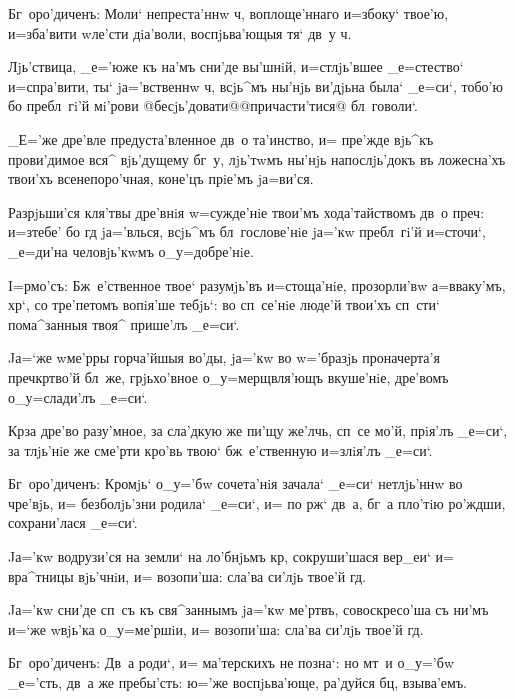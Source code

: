 Бг~оро'диченъ: Моли` непреста'ннw ч, 
воплоще'ннаго и=з\ъ боку` твое'ю, и=зба'вити w\т ле'сти 
дiа'воли, воспjьва'ющыя тя` дв~у ч. 


Лjь'ствица, _е='юже къ на'мъ сни'де вы'шнiй, 
и=стлjь'вшее _е=стество` и=спра'вити, ты` jа='вственнw 
ч, всjь^мъ ны'нjь ви'дjьна была` _е=си`, тобо'ю бо 
пребл~гi'й мi'рови @бесjь'довати@{@причасти'тися@} 
бл~говоли`.

_Е='же дре'вле предуста'вленное дв~о та'инство, и= 
пре'жде вjь^къ прови'димое вся^ вjь'дущему бг~у, лjь'тwмъ 
ны'нjь напослjь'докъ въ ложесна'хъ твои'хъ 
всенепоро'чная, коне'цъ прiе'мъ jа=ви'ся.

Разрjьши'ся кля'твы дре'внiя w=сужде'нiе твои'мъ 
хода'тайствомъ дв~о преч: и=з\ъ тебе' бо гд 
jа='влься, всjь^мъ бл~гослове'нiе jа='кw пребл~гi'й 
и=сточи`, _е=ди'на человjь'кwмъ о_у=добре'нiе.


I=рмо'съ: Бж~е'ственное твое` разумjь'въ и=стоща'нiе, 
прозорли'вw а=вваку'мъ, хр`, со тре'петомъ вопiя'ше 
тебjь`: во сп~се'нiе люде'й твои'хъ сп~сти` пома^занныя 
твоя^ прише'лъ _е=си`.

Jа=`же w\т ме'рры горча'йшыя во'ды, jа='кw во 
w='бразjь проначерта'я преч кр тво'й бл~же, 
грjьхо'вное о_у=мерщвля'ющъ вкуше'нiе, дре'вомъ 
о_у=слади'лъ _е=си`.

Кр за дре'во разу'мное, за сла'дкую же пи'щу 
же'лчь, сп~се мо'й, прiя'лъ _е=си`, за тлjь'нiе же 
сме'рти кро'вь твою` бж~е'ственную и=злiя'лъ _е=си`.

Бг~оро'диченъ: Кромjь` о_у='бw сочета'нiя зачала` 
_е=си` нетлjь'ннw во чре'вjь, и= без\ъ болjь'зни родила` 
_е=си`, и= по рж` дв~а, бг~а пло'тiю ро'ждши, 
сохрани'лася _е=си`. 


Jа='кw водрузи'ся на земли` на ло'бнjьмъ кр, 
сокруши'шася вер_еи` и= вра^тницы вjь'чнiи, и= возопи'ша: 
сла'ва си'лjь твое'й гд.

Jа='кw сни'де сп~съ къ свя^заннымъ jа='кw ме'ртвъ, 
совоскресо'ша съ ни'мъ и=`же w\т вjь'ка о_у=ме'ршiи, и= 
возопи'ша: сла'ва си'лjь твое'й гд.

Бг~оро'диченъ: Дв~а роди`, и= ма'терскихъ не позна`: 
но мт~и о_у='бw _е='сть, дв~а же пребы'сть: ю='же 
воспjьва'юще, ра'дуйся бц, взыва'емъ.


